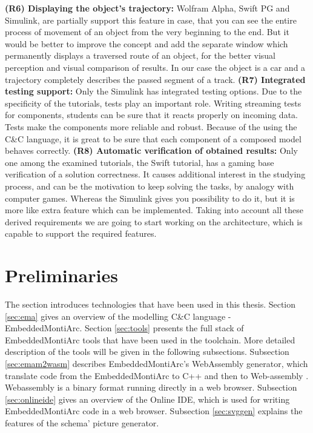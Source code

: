 \textbf{(R6) Displaying the object's trajectory:} Wolfram Alpha, Swift PG and Simulink, are partially support this feature in case, that you can see the entire process of movement of an object from the very beginning to the end. But it would be better to improve the concept and add the separate window which permanently displays a traversed route of an object, for the better visual perception and visual comparison of results. In our case the object is a car and a trajectory completely describes the passed segment of a track. \newline
\textbf{(R7) Integrated testing support:} Only the Simulink has integrated testing options. Due to the specificity of the tutorials, tests play an important role. Writing streaming tests for components, students can be sure that it reacts properly on incoming data. Tests make the components more reliable and robust. Because of the using the C\&C language, it is great to be sure that each component of a composed model behaves correctly.\newline
\textbf{(R8) Automatic verification of obtained results:} Only one among the examined tutorials, the Swift tutorial, has a gaming base verification of a solution correctness. It causes additional interest in the studying process, and can be the motivation to keep solving the tasks, by analogy with computer games. Whereas the Simulink gives you possibility to do it, but it is more like extra feature which can be implemented.\newline
Taking into account all these derived requirements we are going to start working on the architecture, which is capable to support the required features.\newline
\cleardoublepage

\chapter{Preliminaries} \label{sec:preliminaries}
The section introduces technologies that have been used in this thesis. Section \ref{sec:ema} gives an overview of the modelling C\&C language - EmbeddedMontiArc. Section \ref{sec:tools} presents the full stack of EmbeddedMontiArc tools that have been used in the toolchain. More detailed description of the tools will be given in the following subsections. Subsection \ref{sec:emam2wasm} describes EmbeddedMontiArc's WebAssembly generator, which translate code from the EmbeddedMontiArc to C++ and then to Web-assembly \cite{WebAssembly}. Webassembly is a binary format running directly in a web browser. Subsection \ref{sec:onlineide} gives an overview of the Online IDE, which is used for writing EmbeddedMontiArc code in a web browser. Subsection \ref{sec:svggen} explains the features of the schema' picture generator.

